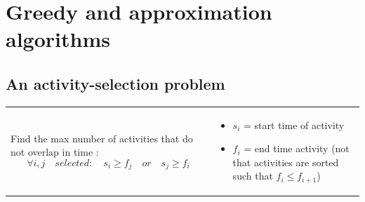 
\section{Greedy and approximation algorithms}


\subsection{An activity-selection problem}
\begin{tabular}{m{6cm}m{10cm}}
    Find the max number of activities that do not
    overlap in time : 
    $$\forall i,j \quad selected: \quad s_i \geq f_j  \quad or \quad s_j \geq f_i$$
    &
\begin{itemize}
    \item $s_i$ = start time of activity
    \item $f_i$ = end time activity (not that activities are 
        sorted such that $f_i \leq f_{i+1}$)
\end{itemize}
\end{tabular}

